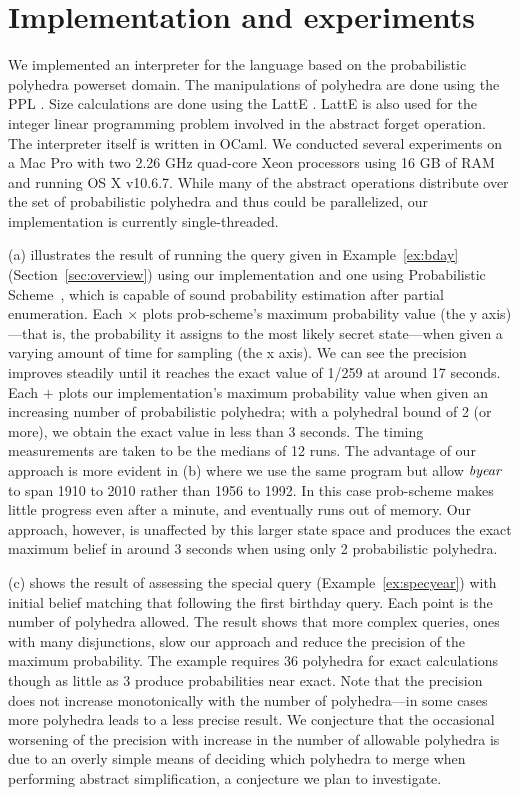 \section{Implementation and experiments}
\label{sec:impl}

We implemented an interpreter for the language based on the
probabilistic polyhedra powerset domain. The manipulations of
polyhedra are done using the PPL \cite{parma}. Size calculations are
done using the LattE \cite{latte}. LattE is also
used for the integer linear programming problem involved in the
abstract forget operation. The interpreter itself is written in OCaml.
We conducted several experiments on a Mac Pro with two 2.26 GHz
quad-core Xeon processors using 16 GB of RAM and running OS X v10.6.7.
While many of the abstract operations distribute over the set of
probabilistic polyhedra and thus could be parallelized, our
implementation is currently single-threaded.

(a) illustrates the result of running the query
given in Example~\ref{ex:bday} (Section~\ref{sec:overview}) using our
implementation and one using Probabilistic
Scheme~\cite{radul07probscheme}, which is capable of sound probability
estimation after partial enumeration.  Each $\times$ plots
prob-scheme's maximum probability value (the y axis)---that is, the
probability it assigns to the most likely secret state---when given a
varying amount of time for sampling (the x axis).  We can see the
precision improves steadily until it reaches the exact value of 1/259
at around 17 seconds. Each $+$ plots our implementation's maximum
probability value when given an increasing number of probabilistic
polyhedra; with a polyhedral bound of 2 (or more), we obtain the exact
value in less than 3 seconds. The timing measurements are taken to be
the medians of 12 runs. The advantage of our approach is more evident
in (b) where we use the same program but allow
$\mathit{byear}$ to span 1910 to 2010 rather than 1956 to 1992. In this
case prob-scheme makes little progress even after a minute, and
eventually runs out of memory.  Our approach, however, is unaffected
by this larger state space and produces the exact maximum belief in
around 3 seconds when using only 2 probabilistic polyhedra.

\ifacita

(c) shows the result of assessing the special
query (Example~\ref{ex:specyear}) with initial belief matching that
following the first birthday query.  Each point is the number of
polyhedra allowed.  The result shows that more complex queries, ones
with many disjunctions, slow our approach and reduce the precision of
the maximum probability. The example requires 36 polyhedra for exact
calculations though as little as 3 produce probabilities near
exact. Note that the precision does not increase monotonically with
the number of polyhedra---in some cases more polyhedra leads to a less
precise result.  We conjecture that the occasional worsening of the
precision with increase in the number of allowable polyhedra is due to
an overly simple means of deciding which polyhedra to merge when
performing abstract simplification, a conjecture we plan to
investigate.

